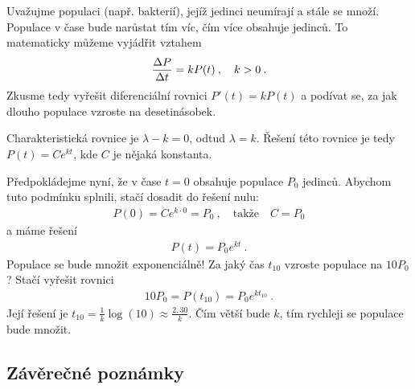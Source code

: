 \begin{example}
    Uvažujme populaci (např. bakterií), jejíž jedinci neumírají a stále se množí.
    Populace v čase bude narůstat tím víc, čím více obsahuje jedinců. To matematicky můžeme vyjádřit vztahem
    \begin{align}
        \frac{\Delta P}{\Delta t} = k P(t) \:, \quad k > 0 \:.
    \end{align} 
    Zkusme tedy vyřešit diferenciální rovnici $P'(t) = k P(t)$ a podívat se, za jak dlouho populace vzroste na desetinásobek.

    Charakteristická rovnice je $\lambda - k = 0$, odtud $\lambda = k$. Řešení této rovnice je tedy $P(t) = C e^{k t} $, kde $C$ je nějaká konstanta.

    Předpokládejme nyní, že v čase $t=0$ obsahuje populace $P_0$ jedinců. Abychom tuto podmínku splnili, stačí dosadit do řešení nulu:
    \begin{align}
        P(0) = C e^{k \cdot 0} = P_0 \:, \quad \text{takže} \quad C = P_0
    \end{align}
    a máme řešení
    \begin{align}
        P(t) = P_0 e^{kt} \:.
    \end{align}
    Populace se bude množit exponenciálně! Za jaký čas $t_{10}$ vzroste populace na $10 P_0$? Stačí vyřešit rovnici 
    \begin{align}
        10 P_0 = P(t_{10}) = P_0 e^{k t_{10}} \:.
    \end{align}
    Její řešení je $t_{10} = \frac{1}{k} \log (10) \approx \frac{2,30}{k}$. Čím větší bude $k$, tím rychleji se populace bude množit.
\end{example}

\subsection*{Závěrečné poznámky}

